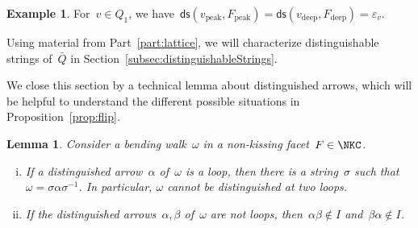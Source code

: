\documentclass{memo-l}
\newtheorem{lemma}[theorem]{Lemma}
\theoremstyle{definition}
\newtheorem{example}[theorem]{Example}
\newcommand{\distinguishedString}[2]{\mathsf{ds}(#1,#2)} %
\newcommand{\peak}{\mathrm{peak}} %
\newcommand{\deep}{\mathrm{deep}} %
\begin{document}
\begin{example}
For~$v \in Q_1$, we have~${\distinguishedString{v_\peak}{F_\peak} = \distinguishedString{v_\deep}{F_\deep} = \varepsilon_v}$.
\end{example}

Using material from Part~\ref{part:lattice}, we will characterize distinguishable strings of~$\bar Q$ in Section~\ref{subsec:distinguishableStrings}.

\medskip
We close this section by a technical lemma about distinguished arrows, which will be helpful to understand the different possible situations in Proposition~\ref{prop:flip}.

\begin{lemma}
\label{lem:weirdDistinguishedArrows}
Consider a bending walk~$\omega$ in a non-kissing facet~$F \in \NKC$.
\begin{enumerate}[(i)]
\item If a distinguished arrow~$\alpha$ of~$\omega$ is a loop, then there is a string~$\sigma$ such that~${\omega = \sigma \alpha \sigma^{-1}}$. In particular, $\omega$ cannot be distinguished at two loops.
\item If the distinguished arrows~$\alpha, \beta$ of~$\omega$ are not loops, then~$\alpha \beta \notin I$ and~$\beta \alpha \notin I$.
\end{enumerate}
\end{lemma}
\end{document}
